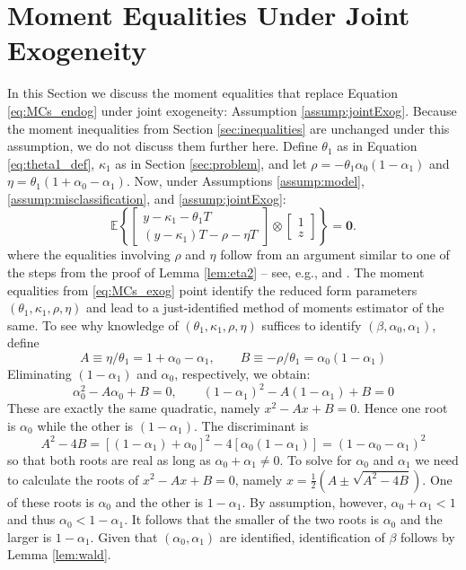 \section{Moment Equalities Under Joint Exogeneity}
\label{sec:FL_mahajan}
In this Section we discuss the moment equalities that replace Equation \ref{eq:MCs_endog} under joint exogeneity: Assumption \ref{assump:jointExog}.
Because the moment inequalities from Section \ref{sec:inequalities} are unchanged under this assumption, we do not discuss them further here.
Define $\theta_1$ as in Equation \ref{eq:theta1_def}, $\kappa_1$ as in Section \ref{sec:problem}, and let $\rho = -\theta_1 \alpha_0 (1 - \alpha_1)$ and $\eta = \theta_1 (1 + \alpha_0 - \alpha_1)$.
Now, under Assumptions \ref{assump:model}, \ref{assump:misclassification}, and \ref{assump:jointExog}:
\begin{equation}
  \mathbb{E}\left\{ \left[
    \begin{array}{c}
    y - \kappa_1 - \theta_1 T \\
    (y - \kappa_1)T - \rho - \eta T
  \end{array}
\right] \otimes \left[
\begin{array}{c}
1 \\ z
\end{array}
\right]\right\} = \mathbf{0}.
\label{eq:MCs_exog}
\end{equation}
where the equalities involving $\rho$ and $\eta$ follow from an argument similar to one of the steps from the proof of Lemma \ref{lem:eta2} -- see, e.g., \cite{FL} and \cite{Mahajan}.
The moment equalities from \ref{eq:MCs_exog} point identify the reduced form parameters $(\theta_1, \kappa_1, \rho,\eta)$ and lead to a just-identified method of moments estimator of the same.
To see why knowledge of $(\theta_1, \kappa_1, \rho,\eta)$ suffices to identify $(\beta, \alpha_0, \alpha_1)$, define
\[
  A \equiv \eta/\theta_1 = 1 + \alpha_0 - \alpha_1, \quad \quad
  B \equiv -\rho/\theta_1 = \alpha_0 (1 - \alpha_1)
\]
Eliminating $(1 - \alpha_1)$ and $\alpha_0$, respectively, we obtain:
\[
  \alpha_0^2 - A\alpha_0 + B = 0, \quad \quad
  (1 - \alpha_1)^2 - A(1 - \alpha_1) + B = 0
\]
These are exactly the same quadratic, namely $x^2 - Ax + B = 0$.
Hence one root is $\alpha_0$ while the other is $(1 - \alpha_1)$.
The discriminant is
\[
  A^2 - 4 B = \left[ (1 - \alpha_1) + \alpha_0 \right]^2 - 4\left[ \alpha_0 (1 - \alpha_1) \right] = (1 - \alpha_0 - \alpha_1)^2
\]
so that both roots are real as long as $\alpha_0 + \alpha_1 \neq 0$.
To solve for $\alpha_0$ and $\alpha_1$ we need to calculate the roots of $x^2 - Ax + B =0$, namely $x = \frac{1}{2}\left( A \pm \sqrt{A^2 - 4B} \right)$.
One of these roots is $\alpha_0$ and the other is $1 - \alpha_1$.
By assumption, however, $\alpha_0 + \alpha_1 < 1$ and thus $\alpha_0 < 1 - \alpha_1$.
It follows that the smaller of the two roots is $\alpha_0$ and the larger is $1 - \alpha_1$.
Given that $(\alpha_0, \alpha_1)$ are identified, identification of $\beta$ follows by Lemma \ref{lem:wald}.

